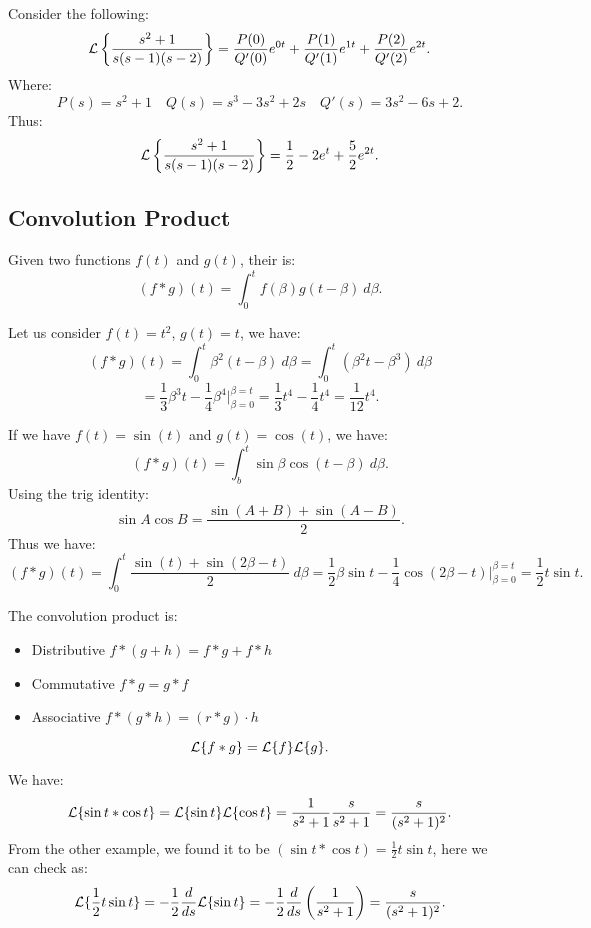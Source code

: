 \documentclass[../main/main.tex]{subfiles}
\begin{document}
\begin{example}
	Consider the following: \[
		\mathcal{L} \left\{ \frac{s^2+1}{s(s-1)(s-2)} \right\} = \frac{P(0)}{Q'(0)}e^{0t} + \frac{P(1)}{Q'(1)} e^{1t} + \frac{P(2)}{Q'(2)}e^{2t}
	.\] Where: \[
	P(s) = s^2+1 \quad Q(s) = s^{3}-3s^2+2s \quad Q'(s) = 3s^2-6s+2
	.\]  Thus: \[
		\mathcal{L} \left\{ \frac{s^2+1}{s(s-1)(s-2)} \right\} = \frac{1}{2} -2 e^{t} + \frac{5}{2}e^{2t} 
	.\] 
\end{example}
\subsection{Convolution Product}
\begin{definition}
	Given two functions $f(t)$ and $g(t)$, their  is: \[
		(f*g)(t) = \int^t_0 f(\beta) g(t-\beta)~d\beta
	.\] 
\end{definition}
\begin{example}
	Let us consider $f(t) = t^2$, $g(t) = t$, we have:  \[
		(f*g)(t) = \int^t_0 \beta^2(t-\beta)~d\beta = \int^t_0 \left( \beta^2t-\beta^{3} \right) ~d\beta
	\] \[
= \frac{1}{3}\beta^{3}t - \frac{1}{4}\beta^{4}\bigg\rvert^{\beta=t}_{\beta=0} = \frac{1}{3}t ^{4}- \frac{1}{4}t ^{4} = \frac{1}{12} t ^{4}
	.\] 
\end{example}
\begin{example}
	If we have $f(t) = \sin(t)$ and $g(t) = \cos(t)$, we have: \[
		(f*g)(t) = \int^t_b \sin \beta \cos(t-\beta)~d\beta 
	.\] Using the trig identity: \[
	\sin A \cos B = \frac{\sin(A+B)+\sin(A-B)}{2}
	.\] Thus we have: \[
(f*g)(t) = \int^t_0 \frac{\sin(t)+\sin(2\beta-t)}{2}~d\beta = \frac{1}{2}\beta\sin t - \frac{1}{4}\cos(2\beta-t)\bigg\rvert ^{\beta=t}_{\beta=0} = \frac{1}{2}t\sin t
	.\] 
\end{example}
\begin{theorem}
	The convolution product is: 
	\begin{itemize}
		\item Distributive $f*(g+h)=f*g+f*h$
		\item Commutative $f*g = g*f$
		\item Associative  $f*(g*h) = (r*g)\cdot h$
	\end{itemize}
\end{theorem}
\begin{theorem}
	\[
	\mathcal{L} \{f*g\} = \mathcal{L} \{ f\} \mathcal{L} \{g\} 
	.\] 
\end{theorem}
\begin{example}
	We have: \[
		\mathcal{L} \{ \sin t * \cos t\} = \mathcal{L} \{\sin t\}\mathcal{L} \{\cos t\}  = \frac{1}{s^2+1}\frac{s}{s^2+1} = \frac{s}{(s^2+1)^2}
		.\] From the other example, we found it to be $(\sin t * \cos t) = \frac{1}{2}t\sin t$, here we can check as: \[
		\mathcal{L}  \{\frac{1}{2}t\sin t\}= -\frac{1}{2}\frac{d}{ds}\mathcal{L} \{ \sin t\}  = -\frac{1}{2}\frac{d}{ds}\left( \frac{1}{s^2+1} \right)   = \frac{s}{(s^2+1)^2}
	.\] 
\end{example}
\end{document}
